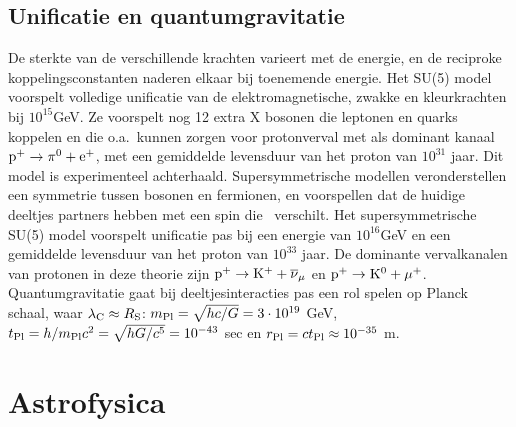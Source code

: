 \documentclass[twoside]{report}
\begin{document}
\section[~~Unificatie en quantumgravitatie]{Unificatie en quantumgravitatie}
De sterkte van de verschillende krachten varieert met de energie, en de
reciproke koppelingsconstanten naderen elkaar bij toenemende energie. Het
SU(5) model voorspelt volledige unificatie van de elektromagnetische, zwakke
en kleurkrachten bij $10^{15}$GeV. Ze voorspelt nog 12 extra X bosonen die
leptonen en quarks koppelen en die o.a.\ kunnen zorgen voor protonverval met
als dominant kanaal ${\rm p}^+\rightarrow\pi^0+{\rm e}^+$, met een gemiddelde
levensduur van het proton van $10^{31}$ jaar. Dit model is experimenteel
achterhaald.
\npar
Supersymmetrische modellen veronderstellen een symmetrie tussen bosonen en
fermionen, en voorspellen dat de huidige deeltjes partners hebben met een
spin die \half\ verschilt. Het supersymmetrische SU(5) model voorspelt
unificatie pas bij een energie van $10^{16}$GeV en een gemiddelde levensduur
van het proton van $10^{33}$ jaar. De dominante vervalkanalen van protonen in
deze theorie zijn ${\rm p}^+\rightarrow{\rm K}^++\overline{\nu}_\mu$ en
${\rm p}^+\rightarrow{\rm K}^0+\mu^+$.
\npar
Quantumgravitatie gaat bij deeltjesinteracties pas een rol spelen op Planck
schaal, waar $\lambda_{\rm C}\approx R_{\rm S}$:
$m_{\rm Pl}=\sqrt{hc/G}=3\cdot10^{19}$ GeV,
$t_{\rm Pl}=h/m_{\rm Pl}c^2=\sqrt{hG/c^5}=10^{-43}$ sec en
$r_{\rm Pl}=ct_{\rm Pl}\approx 10^{-35}$ m.

\chapter{Astrofysica}
\end{document}
